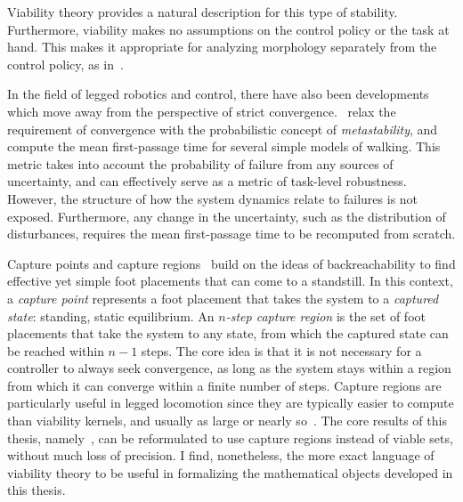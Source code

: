 Viability theory provides a natural description for this type of stability. Furthermore, viability makes no assumptions on the control policy or the task at hand. This makes it appropriate for analyzing morphology separately from the control policy, as in~\cite{heim2019beyond}. \par

In the field of legged robotics and control, there have also been developments which move away from the perspective of strict convergence.~\textcite{byl2009metastable} relax the requirement of convergence with the probabilistic concept of \emph{metastability}, and compute the mean first-passage time for several simple models of walking. This metric takes into account the probability of failure from any sources of uncertainty, and can effectively serve as a metric of task-level robustness.
However, the structure of how the system dynamics relate to failures is not exposed. Furthermore, any change in the uncertainty, such as the distribution of disturbances, requires the mean first-passage time to be recomputed from scratch. \par

Capture points and capture regions~\cite{koolen2012capturability} build on the ideas of backreachability to find effective yet simple foot placements that can come to a standstill. In this context, a \emph{capture point} represents a foot placement that takes the system to a \emph{captured state}: standing, static equilibrium. An \emph{$n$-step capture region} is the set of foot placements that take the system to any state, from which the captured state can be reached within $n-1$ steps.
The core idea is that it is not necessary for a controller to always seek convergence, as long as the system stays within a region from which it can converge within a finite number of steps.
Capture regions are particularly useful in legged locomotion since they are typically easier to compute than viability kernels, and usually as large or nearly so~\cite{koolen2012capturability,zaytsev2018boundaries}. The core results of this thesis, namely~\cite{heim2019beyond,heim2019learnable}, can be reformulated to use capture regions instead of viable sets, without much loss of precision. I find, nonetheless, the more exact language of viability theory to be useful in formalizing the mathematical objects developed in this thesis. \par

